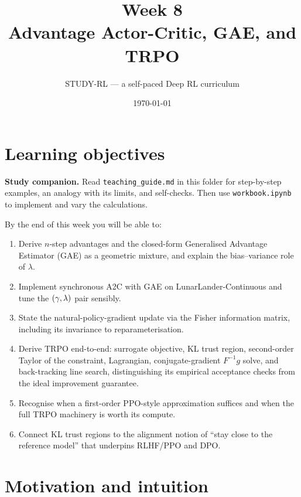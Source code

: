 \documentclass[11pt,oneside]{scrbook}
\title{{\color{rlblue}\textbf{Week 8} \\ \Huge Advantage Actor-Critic, GAE, and TRPO}}
\author{STUDY-RL --- a self-paced Deep RL curriculum}
\date{\today}
\begin{document}
\maketitle
\tableofcontents
\newpage

\chapter*{Learning objectives}


\noindent\textbf{Study companion.} Read \texttt{teaching\_guide.md} in this
folder for step-by-step examples, an analogy with its limits, and self-checks.
Then use \texttt{workbook.ipynb} to implement and vary the calculations.
\par\medskip

\begin{keyidea}
By the end of this week you will be able to:
\begin{enumerate}[leftmargin=*]
  \item Derive $n$-step advantages and the closed-form Generalised Advantage Estimator (GAE) as a geometric mixture, and explain the bias--variance role of $\lambda$.
  \item Implement synchronous A2C with GAE on LunarLander-Continuous and tune the $(\gamma, \lambda)$ pair sensibly.
  \item State the natural-policy-gradient update via the Fisher information matrix, including its invariance to reparameterisation.
  \item Derive TRPO end-to-end: surrogate objective, KL trust region, second-order Taylor of the constraint, Lagrangian, conjugate-gradient $F^{-1}g$ solve, and back-tracking line search, distinguishing its empirical acceptance checks from the ideal improvement guarantee.
  \item Recognise when a first-order PPO-style approximation suffices and when the full TRPO machinery is worth its compute.
  \item Connect KL trust regions to the alignment notion of ``stay close to the reference model'' that underpins RLHF/PPO and DPO.
\end{enumerate}
\end{keyidea}

\chapter{Motivation and intuition}
\end{document}

